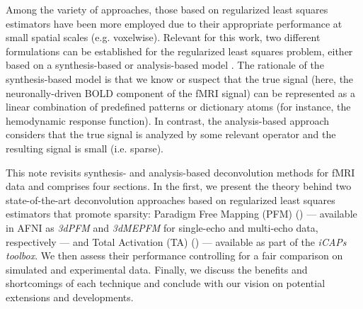 Among the variety of approaches, those based on regularized least squares estimators have been more employed due to their appropriate performance at small spatial scales (e.g. voxelwise). Relevant for this work, two different formulations can be established for the regularized least squares problem, either based on a synthesis-based or analysis-based model \citealt{Elad2007Analysisversussynthesis,Ortelli2020Oracleinequalitiessquare}. The rationale of the synthesis-based model is that we know or suspect that the true signal (here, the neuronally-driven BOLD component of the fMRI signal) can be represented as a linear combination of predefined patterns or dictionary atoms (for instance, the hemodynamic response function). In contrast, the analysis-based approach considers that the true signal is analyzed by some relevant operator and the resulting signal is small (i.e. sparse).  

This note revisits synthesis- and analysis-based deconvolution methods for fMRI data and comprises four sections. In the first, we present the theory behind two state-of-the-art deconvolution approaches based on regularized least squares estimators that promote sparsity: Paradigm Free Mapping (PFM) (\citealt{Gaudes2013Paradigmfreemapping}) --- available in AFNI as \textit{3dPFM} and \textit{3dMEPFM} for single-echo and multi-echo data, respectively --- and Total Activation (TA) (\citealt{Karahanoglu2013TotalactivationfMRI}) --- available as part of the \textit{iCAPs toolbox}. We then assess their performance controlling for a fair comparison on simulated and experimental data. Finally, we discuss the benefits and shortcomings of each technique and conclude with our vision on potential extensions and developments.
